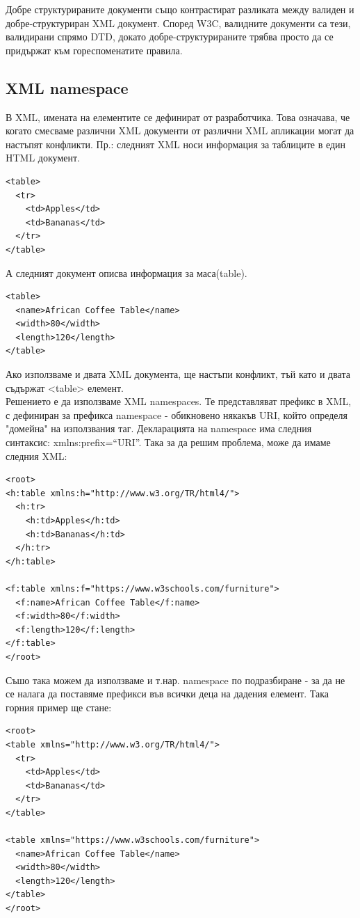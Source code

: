 \documentclass[11pt]{article} %
\begin{document}
Добре структурираните документи също контрастират разликата между валиден и добре-структуриран XML документ. Според W3C, валидните документи са тези, валидирани спрямо DTD, докато добре-структурираните трябва просто да се придържат към гореспоменатите правила. 
\subsection{XML namespace}
В XML, имената на елементите се дефинират от разработчика. Това означава, че когато смесваме различни XML документи от различни XML апликации могат да настъпят конфликти. Пр.: следният XML носи информация за таблиците в един HTML документ.\\
\begin{verbatim}
<table>
  <tr>
    <td>Apples</td>
    <td>Bananas</td>
  </tr>
</table>
\end{verbatim}

А следният документ описва информация за маса(table).\\
\begin{verbatim}
<table>
  <name>African Coffee Table</name>
  <width>80</width>
  <length>120</length>
</table>
\end{verbatim}
Ако използваме и двата XML документа, ще настъпи конфликт, тъй като и двата съдържат <table> елемент.\\
Решението е да използваме XML namespaces. Те представляват префикс в XML, с дефиниран за префикса namespace - обикновено някакъв URI, който определя "домейна" на използвания таг. Декларацията на namespace има следния синтаксис: xmlns:prefix=\enquote{URI}. Така за да решим проблема, може да имаме следния XML:\\
\begin{verbatim}
<root>
<h:table xmlns:h="http://www.w3.org/TR/html4/">
  <h:tr>
    <h:td>Apples</h:td>
    <h:td>Bananas</h:td>
  </h:tr>
</h:table>

<f:table xmlns:f="https://www.w3schools.com/furniture">
  <f:name>African Coffee Table</f:name>
  <f:width>80</f:width>
  <f:length>120</f:length>
</f:table>
</root>
\end{verbatim}
Съшо така можем да използваме и т.нар. namespace по подразбиране - за да не се налага да поставяме префикси във всички деца на дадения елемент. Така горния пример ще стане:\\
\begin{verbatim}
<root>
<table xmlns="http://www.w3.org/TR/html4/">
  <tr>
    <td>Apples</td>
    <td>Bananas</td>
  </tr>
</table>

<table xmlns="https://www.w3schools.com/furniture">
  <name>African Coffee Table</name>
  <width>80</width>
  <length>120</length>
</table>
</root>
\end{verbatim}
\end{document}

